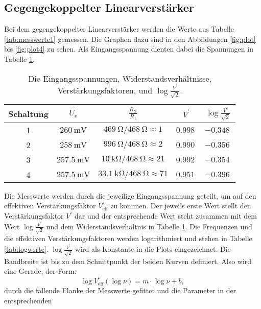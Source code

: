 \documentclass[
  bibliography=totoc,     %
  captions=tableheading,  %
  titlepage=firstiscover, %
]{scrartcl}
\begin{document}
\subsection{Gegengekoppelter Linearverstärker}
Bei dem gegengekoppelter Linearverstärker werden die Werte aus Tabelle \ref{tab:messwerte1}
gemessen. Die Graphen dazu sind in den Abbildungen \ref{fig:plot} bis \ref{fig:plot4}
zu sehen. Als Eingangsspannung dienten dabei die Spannungen in Tabelle \ref{tab:eingangs}.
\begin{table}[H]
  \centering
  \caption{Die Eingangsspannungen, Widerstandsverhältnisse, Verstärkungsfaktoren, und $\log{\frac{V^\prime}{\sqrt{2}}}$.}
  \label{tab:eingangs}
  \begin{tabular}{c c c c c}
    \toprule
    Schaltung & $U_\text{e}$ & $\frac{R_\text{N}}{R_1}$ & $V^\prime$ & $\log{\frac{V^\prime}{\sqrt{2}}}$ \\
    \midrule
    1 & $\SI{260}{\milli\volt}$   & $\SI{469}{\ohm}/\SI{468}{\ohm} \approx 1$        & $\SI{0.998}{}$ & $\SI{-0.348}{}$ \\
    2 & $\SI{258}{\milli\volt}$   & $\SI{996}{\ohm}/\SI{468}{\ohm} \approx 2$        & $\SI{0.990}{}$ & $\SI{-0.356}{}$ \\
    3 & $\SI{257.5}{\milli\volt}$ & $\SI{10}{\kilo\ohm}/\SI{468}{\ohm} \approx 21$   & $\SI{0.992}{}$ & $\SI{-0.354}{}$ \\
    4 & $\SI{257.5}{\milli\volt}$ & $\SI{33.1}{\kilo\ohm}/\SI{468}{\ohm} \approx 71$ & $\SI{0.951}{}$ & $\SI{-0.396}{}$ \\
    \bottomrule
  \end{tabular}
\end{table}
\noindent
Die Messwerte werden durch die jeweilige Eingangsspannung geteilt, um auf den effektiven
Verstärkungsfaktor $V^\prime_\text{eff}$ zu kommen. Der jeweils erste Wert stellt den
Verstärkungsfaktor $V^\prime$ dar und der entsprechende Wert
steht zusammen mit dem Wert $\log{\frac{V^\prime}{\sqrt{2}}}$ und dem Widerstandsverhältnis
in Tabelle \ref{tab:eingangs}. Die Frequenzen und die effektiven
Verstärkungsfaktoren werden logarithmiert und stehen in Tabelle \ref{tab:logwerte}.
$\log{\frac{V^\prime}{\sqrt{2}}}$ wird als Konstante in die Plots eingezeichnet. Die
Bandbreite ist bis zu dem Schnittpunkt der beiden Kurven definiert. Also wird
eine Gerade, der Form:
\begin{equation*}
  \log{V^\prime_\text{eff}} (\log{\nu}) = m \cdot \log{\nu} + b,
\end{equation*}
durch die fallende Flanke der Messwerte gefittet und die Parameter in der entsprechenden
\end{document}
